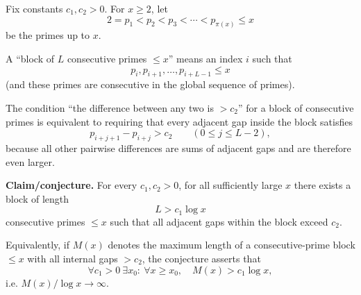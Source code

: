 Fix constants $c_1,c_2>0$. For $x\ge 2$, let
\[2=p_1<p_2<p_3<\cdots<p_{\pi(x)}\le x\]
be the primes up to $x$.

A ``block of $L$ consecutive primes $\le x$'' means an index $i$ such that
\[p_i, p_{i+1},\dots,p_{i+L-1}\le x\]
(and these primes are consecutive in the global sequence of primes).

The condition ``the difference between any two is $>c_2$'' for a block of consecutive primes is equivalent to requiring that every adjacent gap inside the block satisfies
\[p_{i+j+1}-p_{i+j}>c_2\qquad (0\le j\le L-2),\]
because all other pairwise differences are sums of adjacent gaps and are therefore even larger.

\textbf{Claim/conjecture.} For every $c_1,c_2>0$, for all sufficiently large $x$ there exists a block of length
\[L > c_1\log x\]
consecutive primes $\le x$ such that all adjacent gaps within the block exceed $c_2$.

Equivalently, if $M(x)$ denotes the maximum length of a consecutive-prime block $\le x$ with all internal gaps $>c_2$, the conjecture asserts that
\[\forall c_1>0\ \exists x_0:\ \forall x\ge x_0,\quad M(x)>c_1\log x,\]
i.e. $M(x)/\log x\to\infty$.

\item
